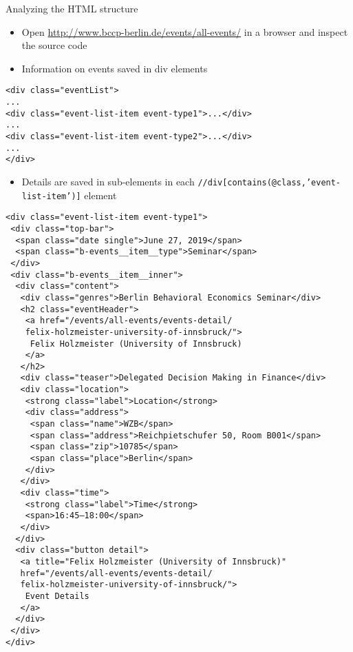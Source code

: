 \begin{frame}{Analyzing the HTML structure}
\begin{itemize}
	\item Open \url{http://www.bccp-berlin.de/events/all-events/} in a browser and inspect the source code
	\item Information on events saved in div elements
\end{itemize}
\begin{verbatim}
<div class="eventList">
...
<div class="event-list-item event-type1">...</div>
...
<div class="event-list-item event-type2">...</div>
...
</div>
\end{verbatim}

\framebreak

\begin{itemize}
	\item Details are saved in sub-elements in each \texttt{//div[contains(@class,'event-list-item')]} element
\end{itemize}
\begin{verbatim}
<div class="event-list-item event-type1">
 <div class="top-bar">
  <span class="date single">June 27, 2019</span>
  <span class="b-events__item__type">Seminar</span>
 </div>
 <div class="b-events__item__inner">
  <div class="content">
   <div class="genres">Berlin Behavioral Economics Seminar</div>
   <h2 class="eventHeader">
    <a href="/events/all-events/events-detail/
    felix-holzmeister-university-of-innsbruck/">
     Felix Holzmeister (University of Innsbruck)
    </a>
   </h2>
   <div class="teaser">Delegated Decision Making in Finance</div>
   <div class="location">
    <strong class="label">Location</strong>
    <div class="address">
     <span class="name">WZB</span>
     <span class="address">Reichpietschufer 50, Room B001</span>
     <span class="zip">10785</span>
     <span class="place">Berlin</span>
    </div>
   </div>
   <div class="time">
    <strong class="label">Time</strong>
    <span>16:45–18:00</span>
   </div>
  </div>
  <div class="button detail">
   <a title="Felix Holzmeister (University of Innsbruck)" 
   href="/events/all-events/events-detail/
   felix-holzmeister-university-of-innsbruck/">
    Event Details
   </a>
  </div>
 </div>
</div>
\end{verbatim}
\end{frame}

